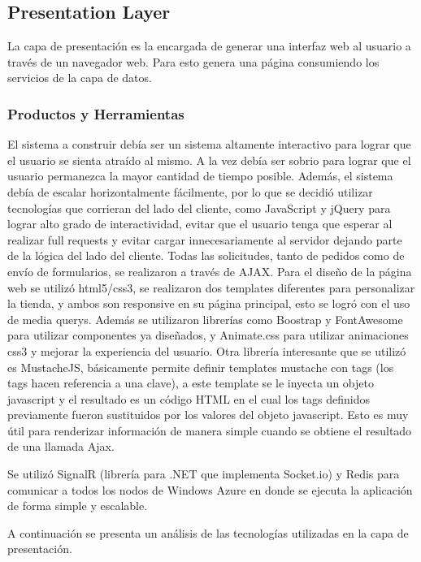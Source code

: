 \documentclass[journal]{IEEEtran}
\begin{document}
\subsection{Presentation Layer}
La capa de presentación es la encargada de generar una interfaz web al usuario a través de un navegador web. Para esto genera una página consumiendo los servicios de la capa de datos.

\subsubsection{Productos y Herramientas}
El sistema a construir debía ser un sistema altamente interactivo para lograr que el usuario se sienta atraído al mismo. A la vez debía ser sobrio para lograr que el usuario permanezca la mayor cantidad de tiempo posible. Además, el sistema debía de escalar horizontalmente fácilmente, por lo que se decidió utilizar tecnologías que corrieran del lado del cliente, como JavaScript y jQuery para lograr alto grado de interactividad, evitar que el usuario tenga que esperar al realizar full requests y evitar cargar innecesariamente al servidor dejando parte de la lógica del lado del cliente. Todas las solicitudes, tanto de pedidos como de envío de formularios, se realizaron a través de AJAX. Para el diseño de la página web se utilizó html5/css3, se realizaron dos templates diferentes para personalizar la tienda, y ambos son responsive en su página principal, esto se logró con el uso de media querys. Además se utilizaron librerías como Boostrap y FontAwesome para utilizar componentes ya diseñados, y Animate.css para utilizar animaciones css3 y mejorar la experiencia del usuario.
Otra librería interesante que se utilizó es MustacheJS, básicamente permite definir templates mustache con tags (los tags hacen referencia a una clave), a este template se le inyecta un objeto javascript y el resultado es un código HTML en el cual los tags definidos previamente fueron sustituidos por los valores del objeto javascript. Esto es muy útil para renderizar información de manera simple cuando se obtiene el resultado de una llamada Ajax.

Se utilizó SignalR (librería para .NET que implementa Socket.io) y Redis para comunicar a todos los nodos de Windows Azure en donde se ejecuta la aplicación de forma simple y escalable.

A continuación se presenta un análisis de las tecnologías utilizadas en la capa de presentación. 
\end{document}
